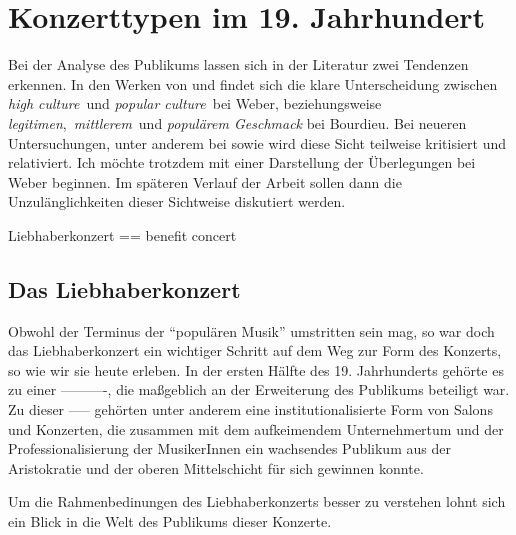 \documentclass[a4paper, german, oneside]{scrbook}
\newcommand{\citet}[1]{\textcite{#1}}
\begin{document}
\section{Konzerttypen im 19. Jahrhundert}
\label{konzerttypen}
Bei der Analyse des Publikums lassen sich in der Literatur zwei Tendenzen erkennen. In den Werken von \citet{weber_music_2004} und \citet{bourdieu_feinen_2012} findet sich die klare Unterscheidung zwischen \emph{high culture} und \emph{popular culture} bei Weber, beziehungsweise \emph{legitimen}, \emph{mittlerem} und \emph{populärem Geschmack} bei Bourdieu. Bei neueren Untersuchungen, unter anderem bei \citet{gebesmair_grundzuge_2001} sowie \citet{muller_publikum_2014} wird diese Sicht teilweise kritisiert und relativiert. Ich möchte trotzdem mit einer Darstellung der Überlegungen bei Weber beginnen. Im späteren Verlauf der Arbeit sollen dann die Unzulänglichkeiten dieser Sichtweise diskutiert werden.

Liebhaberkonzert == benefit concert

\subsection{Das Liebhaberkonzert}
\label{liebhaber}
Obwohl der Terminus der \enquote{populären Musik} umstritten sein mag, so war doch das Liebhaberkonzert ein wichtiger Schritt auf dem Weg zur Form des Konzerts, so wie wir sie heute erleben. In der ersten Hälfte des 19. Jahrhunderts gehörte es zu einer ----------, die maßgeblich an der Erweiterung des Publikums beteiligt war. Zu dieser ----- gehörten unter anderem eine institutionalisierte Form von Salons und Konzerten, die zusammen mit dem aufkeimendem Unternehmertum und der Professionalisierung der MusikerInnen ein wachsendes Publikum aus der Aristokratie und der oberen Mittelschicht für sich gewinnen konnte.

Um die Rahmenbedinungen des Liebhaberkonzerts besser zu verstehen lohnt sich ein Blick in die Welt des Publikums dieser Konzerte.
\end{document}
